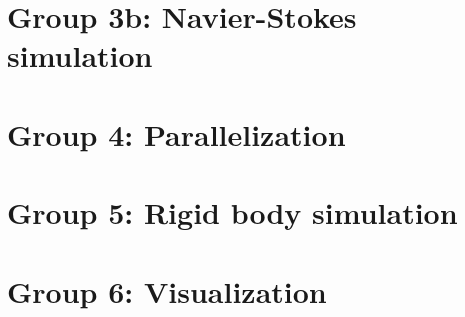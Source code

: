 \documentclass[11pt,a4paper]{article}
\begin{document}
\section{Group 3b: Navier-Stokes simulation}



\section{Group 4: Parallelization}



\section{Group 5: Rigid body simulation}



\section{Group 6: Visualization}


  
\end{document}
